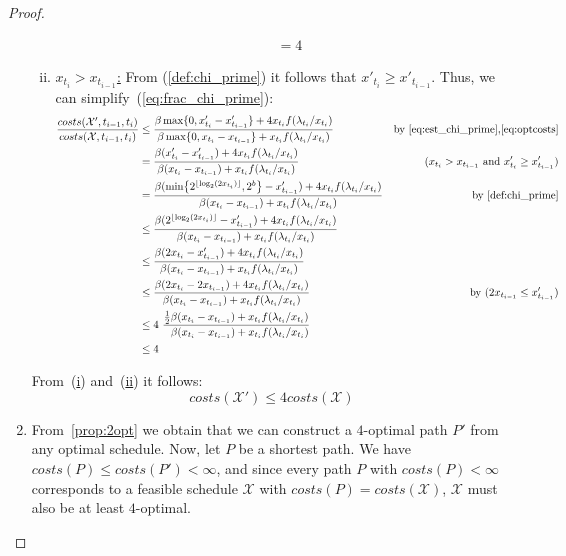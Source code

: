 \documentclass[hidelinks]{article}
\theoremstyle{plain}
\theoremstyle{definition}
\theoremstyle{rem}
\newcommand{\mx}{\mathcal{X}}
\begin{document}
\begin{proof}
\begin{enumerate}
\begin{enumerate}[(i)]
\begin{align*}
			&=4
		\end{align*}
		\item\label{pr:4appr_2} \underline{$x_{t_i}>x_{t_{i-1}}$:}
		From (\ref{def:chi_prime}) it follows that $x'_{t_i}\ge x'_{t_{i-1}}$. Thus, we can simplify~(\ref{eq:frac_chi_prime}):
		\begin{align*}
			\frac{costs(\mx',t_{i-1},t_i)}{costs(\mx,t_{i-1},t_i)}&\le\frac{\beta\max\{0,x'_{t_i}-x'_{t_{i-1}}\}+4x_{t_i}f(\lambda_{t_i}/x_{t_i})}{\beta\max\{0,x_{t_i}-x_{t_{i-1}}\}+x_{t_i}f(\lambda_{t_i}/x_{t_i})}&\text{by \eqref{eq:est_chi_prime},\eqref{eq:optcosts}}\\
			&=\frac{\beta(x'_{t_i}-x'_{t_{i-1}})+4x_{t_i}f(\lambda_{t_i}/x_{t_i})}{\beta(x_{t_i}-x_{t_{i-1}})+x_{t_i}f(\lambda_{t_i}/x_{t_i})}&\text{($x_{t_i}>x_{t_{i-1}}$ and $x'_{t_i}\ge x'_{t_{i-1}}$)}\\
			&=\frac{\beta(\min\bigl\{2^{\lfloor \log_2(2x_{t_i})\rfloor},2^b\bigr\}-x'_{t_{i-1}})+4x_{t_i}f(\lambda_{t_i}/x_{t_i})}{\beta(x_{t_i}-x_{t_{i-1}})+x_{t_i}f(\lambda_{t_i}/x_{t_i})}&\text{by \eqref{def:chi_prime}}\\
			&\le\frac{\beta(2^{\lfloor \log_2(2x_{t_i})\rfloor}-x'_{t_{i-1}})+4x_{t_i}f(\lambda_{t_i}/x_{t_i})}{\beta(x_{t_i}-x_{t_{i-1}})+x_{t_i}f(\lambda_{t_i}/x_{t_i})}\\
			&\le\frac{\beta(2x_{t_i}-x'_{t_{i-1}})+4x_{t_i}f(\lambda_{t_i}/x_{t_i})}{\beta(x_{t_i}-x_{t_{i-1}})+x_{t_i}f(\lambda_{t_i}/x_{t_i})}\\
			&\le\frac{\beta(2x_{t_i}-2x_{t_{i-1}})+4x_{t_i}f(\lambda_{t_i}/x_{t_i})}{\beta(x_{t_i}-x_{t_{i-1}})+x_{t_i}f(\lambda_{t_i}/x_{t_i})}&\text{by ($2x_{t_{i-1}}\le x'_{t_{i-1}}$)}\\
			&\le4\ \frac{\frac{1}{2}\beta(x_{t_i}-x_{t_{i-1}})+x_{t_i}f(\lambda_{t_i}/x_{t_i})}{\ \ \beta(x_{t_i}-x_{t_{i-1}})+x_{t_i}f(\lambda_{t_i}/x_{t_i})}\\
			&\le4
		\end{align*}
	\end{enumerate}
	From~(\hyperref[pr:4appr_1]{i}) and~(\hyperref[pr:4appr_2]{ii}) it follows:
	\begin{equation*}
		costs(\mx')\le4costs(\mx)
	\end{equation*}
	\item From~\ref{prop:2opt} we obtain that we can construct a $4$-optimal path $P'$ from any optimal schedule. Now, let $P$ be a shortest path. We have $costs(P)\le costs(P')<\infty$, and since every path $P$ with $costs(P)<\infty$ corresponds to a feasible schedule $\mx$ with $costs(P)=costs(\mx)$, $\mx$ must also be at least $4$-optimal.
\end{enumerate}
\end{proof}
\end{document}
